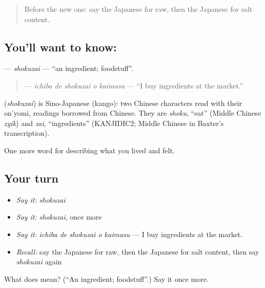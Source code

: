 \label{lesson:JA-C496-shokuzai}



\begin{quote}
Before the new one: say the Japanese for raw, then the Japanese for salt content.
\end{quote}

\subsection*{You'll want to know: }
\textbf{} — \emph{shokuzai} — \textquotedblleft{}an ingredient; foodstuff\textquotedblright{}.

\begin{quote}
\textbf{  } — \emph{ichiba de shokuzai o kaimasu} — \textquotedblleft{}I buy ingredients at the market.\textquotedblright{}
\end{quote}

\begin{cousinweb}
\textbf{} (\emph{shokuzai}) is Sino-Japanese (kango): two Chinese characters read with their on'yomi, readings borrowed from Chinese. They are \emph{shoku}, \textquotedblleft{}eat\textquotedblright{} (Middle Chinese \emph{zyik}) and \emph{zai}, \textquotedblleft{}ingredients\textquotedblright{} (KANJIDIC2; Middle Chinese in Baxter's transcription).
\end{cousinweb}

\begin{grammarlens}[title={What you've built}]
One more word for describing what you lived and felt.
\end{grammarlens}

\subsection*{Your turn}
\begin{itemize}
\raggedright
  \item \emph{Say it:} \emph{shokuzai}
  \item \emph{Say it:} \emph{shokuzai}, once more
  \item \emph{Say it:} \emph{ichiba de shokuzai o kaimasu} — I buy ingredients at the market.
  \item \emph{Recall:} say the Japanese for raw, then the Japanese for salt content, then say \emph{shokuzai} again
\end{itemize}

\begin{tcolorbox}[breakable,colback=teal!4,colframe=teal!35!black,title={Before you move on}]
What does  mean? (\textquotedblleft{}An ingredient; foodstuff\textquotedblright{}.) Say it once more.
\end{tcolorbox}
